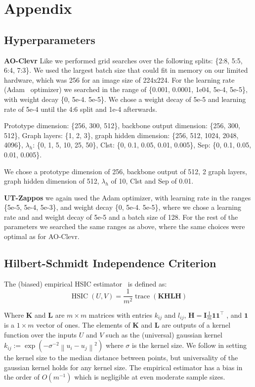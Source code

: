 \documentclass{article}
\begin{document}


\appendix

\section{Appendix}
\subsection{Hyperparameters}
\label{ap:hyperparam}
\textbf{AO-Clevr} Like \citet{atzmon2020causal} we performed grid searches over the following splits: \{2:8, 5:5, 6:4, 7:3\}. We used the largest batch size that could fit in memory on our limited hardware, which was 256 for an image size of 224x224. For the learning rate (Adam~\citep{Kingma2014} optimizer) we searched in the range of \{0.001, 0.0001, 1e04, 5e-4, 5e-5\}, with weight decay \{0, 5e-4. 5e-5\}. We chose a weight decay of 5e-5 and learning rate of 5e-4 until the 4:6 split and 1e-4 afterwards.

Prototype dimension: \{256, 300, 512\}, backbone output dimension: \{256, 300, 512\}, Graph layers: \{1, 2, 3\}, graph hidden dimension: \{256, 512, 1024, 2048, 4096\}, $\lambda_h$: \{0, 1, 5, 10, 25, 50\}, Clst: \{0, 0.1, 0.05, 0.01, 0.005\}, Sep: \{0, 0.1, 0.05, 0.01, 0.005\}.

We chose a prototype dimension of 256, backbone output of 512, 2 graph layers, graph hidden dimension of 512, $\lambda_h$ of 10, Clst and Sep of 0.01.

\textbf{UT-Zappos} we again used the Adam optimizer, with learning rate in the ranges \{5e-5, 5e-4, 5e-3\}, and weight decay \{0, 5e-4. 5e-5\}, where we chose a learning rate and and weight decay of 5e-5 and a batch size of 128. For the rest of the parameters we searched the same ranges as above, where the same choices were optimal as for AO-Clevr.


\subsection{Hilbert-Schmidt Independence Criterion}
\label{ap:hsic}
The (biased) empirical HSIC estimator~\citep{gretton2007kernel} is defined as:
$$ \operatorname{HSIC}(U, V) = \frac{1}{m^{2}} \operatorname{trace}(\mathbf{K H L H}) $$

\noindent Where $\mathbf{K}$ and $\mathbf{L}$ are $m \times m$ matrices with entries $k_{ij}$ and $l_{ij}$,   $\mathbf{H} = \mathbf{I} \frac{1}{m}\mathbf{1}\mathbf{1}^\top$ , and $\mathbf{1}$ is a $1 \times m$ vector of ones. The elements of $\mathbf{K}$ and $\mathbf{L}$ are outputs of a kernel function over the inputs $U$ and $V$ such as the (universal) gaussian kernel $k_{i j} :=\exp \left(-\sigma^{-2}\left\|u_{i}-u_{j}\right\|^{2}\right)$ where $\sigma$ is the kernel size. We follow \citet{gretton2007kernel} in setting the kernel size to the median distance between points, but universality of the gaussian kernel holds for any kernel size. The empirical estimator has a bias in the order of $O(m^{-1})$ which is negligible at even moderate sample sizes.
\end{document}
